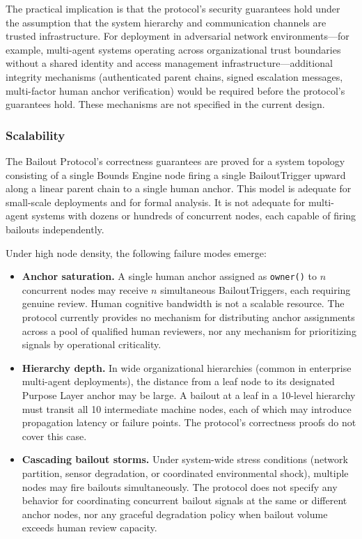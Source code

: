 \documentclass[12pt]{article}
\begin{document}
The practical implication is that the protocol's security guarantees hold under the assumption that the system hierarchy and communication channels are trusted infrastructure. For deployment in adversarial network environments---for example, multi-agent systems operating across organizational trust boundaries without a shared identity and access management infrastructure---additional integrity mechanisms (authenticated parent chains, signed escalation messages, multi-factor human anchor verification) would be required before the protocol's guarantees hold. These mechanisms are not specified in the current design.

\subsubsection{Scalability}\label{sec:scalability}

The Bailout Protocol's correctness guarantees are proved for a system topology consisting of a single Bounds Engine node firing a single BailoutTrigger upward along a linear parent chain to a single human anchor. This model is adequate for small-scale deployments and for formal analysis. It is not adequate for multi-agent systems with dozens or hundreds of concurrent nodes, each capable of firing bailouts independently.

Under high node density, the following failure modes emerge:

\begin{itemize}\setlength\itemsep{0.25em}
\item \textbf{Anchor saturation.} A single human anchor assigned as \texttt{owner()} to $n$ concurrent nodes may receive $n$ simultaneous BailoutTriggers, each requiring genuine review. Human cognitive bandwidth is not a scalable resource. The protocol currently provides no mechanism for distributing anchor assignments across a pool of qualified human reviewers, nor any mechanism for prioritizing signals by operational criticality.
\item \textbf{Hierarchy depth.} In wide organizational hierarchies (common in enterprise multi-agent deployments), the distance from a leaf node to its designated Purpose Layer anchor may be large. A bailout at a leaf in a 10-level hierarchy must transit all 10 intermediate machine nodes, each of which may introduce propagation latency or failure points. The protocol's correctness proofs do not cover this case.
\item \textbf{Cascading bailout storms.} Under system-wide stress conditions (network partition, sensor degradation, or coordinated environmental shock), multiple nodes may fire bailouts simultaneously. The protocol does not specify any behavior for coordinating concurrent bailout signals at the same or different anchor nodes, nor any graceful degradation policy when bailout volume exceeds human review capacity.
\end{itemize}
\end{document}
